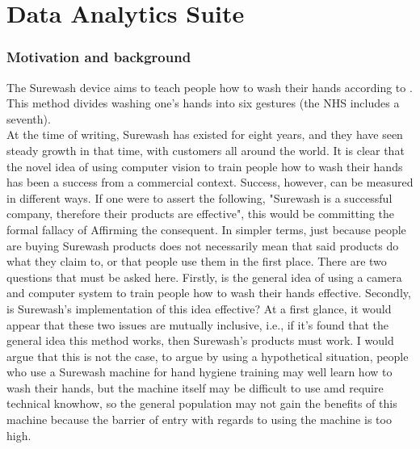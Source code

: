 \part{Data Analytics Suite}
\section{Motivation and background}
The Surewash device aims to teach people how to wash their hands according to \cite{who_handhygiene}. This method divides washing one's hands into six gestures (the NHS includes a seventh).\\

At the time of writing, Surewash has existed for eight years, and they have seen steady growth in that time, with customers all around the world. It is clear that the novel idea of using computer vision to train people how to wash their hands has been a success from a commercial context. Success, however, can be measured in different ways. If one were to assert the following, "Surewash is a successful company, therefore their products are effective", this would be committing the formal fallacy of Affirming the consequent. In simpler terms, just because people are buying Surewash products does not necessarily mean that said products do what they claim to, or that people use them in the first place. There are two questions that must be asked here. Firstly, is the general idea of using a camera and computer system to train people how to wash their hands effective. Secondly, is Surewash's implementation of this idea effective? At a first glance, it would appear that these two issues are mutually inclusive, i.e., if it's found that the general idea this method works, then Surewash's products must work. I would argue that this is not the case, to argue by using a hypothetical situation, people who use a Surewash machine for hand hygiene training may well learn how to wash their hands, but the machine itself may be difficult to use amd require technical knowhow, so the general population may not gain the benefits of this machine because the barrier of entry with regards to using the machine is too high.\\

